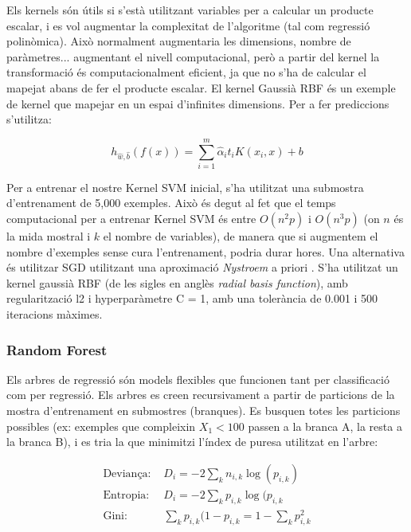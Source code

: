 \documentclass[12pt, spanish]{article}
\begin{document}
Els kernels són útils si s'està utilitzant variables per a calcular un producte escalar, i es vol augmentar la complexitat de l'algoritme (tal com regressió polinòmica). Això normalment augmentaria les dimensions, nombre de paràmetres... augmentant el nivell computacional, però a partir del kernel la transformació és computacionalment eficient, ja que no s'ha de calcular el mapejat abans de fer el producte escalar. El kernel Gaussià RBF és un exemple de kernel que  mapejar en un espai d'infinites dimensions. Per a fer prediccions s'utilitza:

$$
h_{\hat{w}, \hat{b}}(f(x)) = \sum^m_{i = 1} \hat{\alpha}_i t_i K(x_i, x) + b
$$

Per a entrenar el nostre Kernel SVM inicial, s'ha utilitzat una submostra d'entrenament de 5,000 exemples. Això és degut al fet que el temps computacional per a entrenar Kernel SVM és entre $O(n^2 p)$  i $O(n^3 p)$ (on $n$ és la mida mostral i $k$ el nombre de variables), de manera que si augmentem el nombre d'exemples sense cura l'entrenament, podria durar hores. Una alternativa és utilitzar SGD utilitzant una aproximació \textit{Nystroem} a priori \cite{sklearn}. S'ha utilitzat un kernel gaussià RBF (de les sigles en anglès \textit{radial basis function}), amb regularització l2 i hyperparàmetre C = 1, amb una tolerància de 0.001 i 500 iteracions màximes. 

\subsubsection{Random Forest}

Els arbres de regressió són models flexibles que funcionen tant per classificació com per regressió. Els arbres es creen recursivament a partir de particions de la mostra d'entrenament en submostres (branques). Es busquen totes les particions possibles (ex: exemples que compleixin $X_1 < 100$ passen a la branca A, la resta a la branca B), i es tria la que minimitzi l'índex de puresa utilitzat en l'arbre:

\begin{equation} 
\begin{split}
\text{Deviança: } & D_i = -2 \sum_k n_{i,k} \log(p_{i,k}) \\
\text{Entropia: }&  D_i = -2 \sum_k p_{i,k}\log(p_{i,k}\\
\text{Gini: }& \sum_k p_{i,k}(1 - p_{i,k} = 1 - \sum_k p_{i,k}^2
\end{split}
\end{equation}
\end{document}
